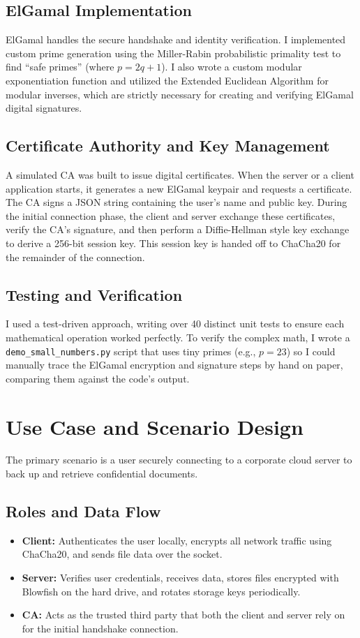\documentclass[12pt,a4paper]{article}
\begin{document}
\subsection{ElGamal Implementation}
ElGamal handles the secure handshake and identity verification. I implemented custom prime generation using the Miller-Rabin probabilistic primality test to find ``safe primes'' (where $p = 2q + 1$). I also wrote a custom modular exponentiation function and utilized the Extended Euclidean Algorithm for modular inverses, which are strictly necessary for creating and verifying ElGamal digital signatures. 

\subsection{Certificate Authority and Key Management}
A simulated CA was built to issue digital certificates. When the server or a client application starts, it generates a new ElGamal keypair and requests a certificate. The CA signs a JSON string containing the user's name and public key. During the initial connection phase, the client and server exchange these certificates, verify the CA's signature, and then perform a Diffie-Hellman style key exchange to derive a 256-bit session key. This session key is handed off to ChaCha20 for the remainder of the connection.

\subsection{Testing and Verification}
I used a test-driven approach, writing over 40 distinct unit tests to ensure each mathematical operation worked perfectly. To verify the complex math, I wrote a \texttt{demo\_small\_numbers.py} script that uses tiny primes (e.g., $p=23$) so I could manually trace the ElGamal encryption and signature steps by hand on paper, comparing them against the code's output.

\section{Use Case and Scenario Design}
The primary scenario is a user securely connecting to a corporate cloud server to back up and retrieve confidential documents.

\subsection{Roles and Data Flow}
\begin{itemize}
    \item \textbf{Client:} Authenticates the user locally, encrypts all network traffic using ChaCha20, and sends file data over the socket.
    \item \textbf{Server:} Verifies user credentials, receives data, stores files encrypted with Blowfish on the hard drive, and rotates storage keys periodically.
    \item \textbf{CA:} Acts as the trusted third party that both the client and server rely on for the initial handshake connection.
\end{itemize}
\end{document}
